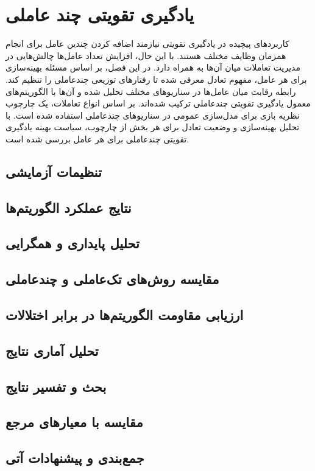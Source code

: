 \chapter{یادگیری تقویتی چند عاملی}
کاربردهای پیچیده در یادگیری تقویتی نیازمند اضافه کردن چندین عامل برای انجام همزمان وظایف مختلف هستند.
با این حال، افزایش تعداد عامل‌ها چالش‌هایی در مدیریت تعاملات میان آن‌ها به همراه دارد.
در این فصل، بر اساس مسئله بهینه‌سازی برای هر عامل، مفهوم تعادل معرفی شده تا رفتارهای توزیعی چندعاملی را تنظیم کند.
رابطه رقابت میان عامل‌ها در سناریوهای مختلف تحلیل شده و آن‌ها با الگوریتم‌های معمول یادگیری تقویتی چندعاملی ترکیب شده‌اند. بر اساس انواع تعاملات، یک چارچوب نظریه بازی برای مدل‌سازی عمومی در سناریوهای چندعاملی استفاده شده است. با تحلیل بهینه‌سازی و وضعیت تعادل برای هر بخش از چارچوب، سیاست بهینه یادگیری تقویتی چندعاملی برای هر عامل بررسی شده است.




  
    
    
    
    
%    
%    
       \section{تنظیمات آزمایشی}
    \section{نتایج عملکرد الگوریتم‌ها}
    \section{تحلیل پایداری و همگرایی}
    \section{مقایسه روش‌های تک‌عاملی و چندعاملی}
    \section{ارزیابی مقاومت الگوریتم‌ها در برابر اختلالات}
    \section{تحلیل آماری نتایج}
    \section{بحث و تفسیر نتایج}
    \section{مقایسه با معیارهای مرجع}
    \section{جمع‌بندی و پیشنهادات آتی} 
